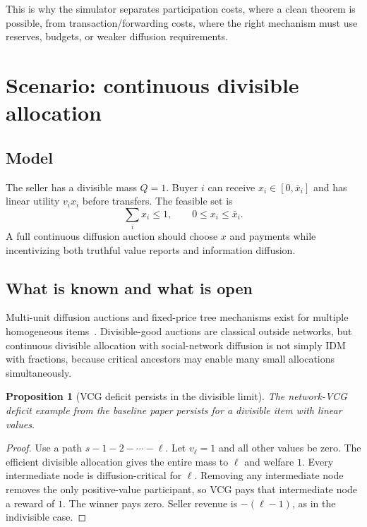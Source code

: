 \documentclass[11pt]{article}
\newtheorem{proposition}{Proposition}
\begin{document}
This is why the simulator separates participation costs, where a clean theorem is possible, from transaction/forwarding costs, where the right mechanism must use reserves, budgets, or weaker diffusion requirements.

\section{Scenario: continuous divisible allocation}

\subsection{Model}

The seller has a divisible mass $Q=1$.  Buyer $i$ can receive $x_i\in[0,\bar x_i]$ and has linear utility $v_i x_i$ before transfers.  The feasible set is
\[
    \sum_i x_i\le 1,\qquad 0\le x_i\le \bar x_i.
\]
A full continuous diffusion auction should choose $x$ and payments while incentivizing both truthful value reports and information diffusion.

\subsection{What is known and what is open}

Multi-unit diffusion auctions and fixed-price tree mechanisms exist for multiple homogeneous items~\cite{zhao2018multi,fang2023multiunit,yu2024tree}.  Divisible-good auctions are classical outside networks, but continuous divisible allocation with social-network diffusion is not simply IDM with fractions, because critical ancestors may enable many small allocations simultaneously.

\begin{proposition}[VCG deficit persists in the divisible limit]
The network-VCG deficit example from the baseline paper persists for a divisible item with linear values.
\end{proposition}

\begin{proof}
Use a path $s-1-2-\cdots-\ell$.  Let $v_\ell=1$ and all other values be zero.  The efficient divisible allocation gives the entire mass to $\ell$ and welfare $1$.  Every intermediate node is diffusion-critical for $\ell$.  Removing any intermediate node removes the only positive-value participant, so VCG pays that intermediate node a reward of $1$.  The winner pays zero.  Seller revenue is $-(\ell-1)$, as in the indivisible case.
\end{proof}
\end{document}
